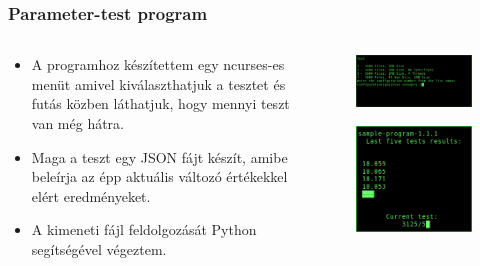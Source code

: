 \documentclass{beamer}
\begin{document}
\begin{frame}
\frametitle{Parameter-test program}

\begin{columns}
\begin{column}{0.5\textwidth}
\begin{itemize}
\item A programhoz készítettem egy ncurses-es menüt amivel kiválaszthatjuk a tesztet és futás közben láthatjuk, hogy mennyi teszt van még hátra.
\item Maga a teszt egy JSON fájt készít, amibe beleírja az épp aktuális változó értékekkel elért eredményeket.
\item A kimeneti fájl feldolgozását Python segítségével végeztem. 
\end{itemize}
\end{column}

\begin{column}{0.5\textwidth}
\begin{figure}
\begin{center}
\includegraphics[width=\textwidth]{images/parameter-test-select.png}
\end{center}		
\end{figure}

\begin{figure}
\begin{center}
\includegraphics[height=0.3\textheight]{images/parameter-test.png}
\end{center}	
\end{figure}
\end{column}

\end{columns}
\end{frame}
\end{document}
